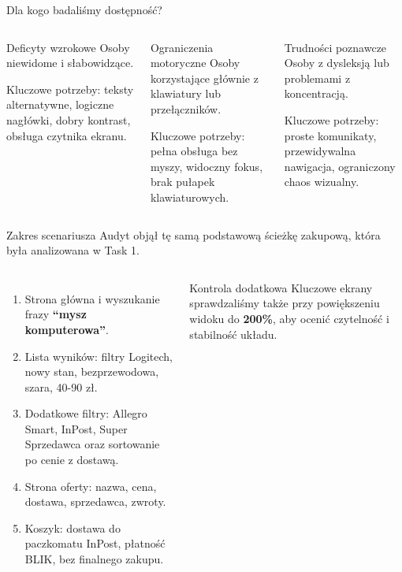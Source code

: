 \documentclass[aspectratio=169,11pt]{beamer}
\newcommand{\tagline}[1]{\textcolor{Slate}{\small #1}}
\begin{document}
\begin{frame}{Dla kogo badaliśmy dostępność?}
  \begin{columns}[T,totalwidth=\textwidth]
      \begin{block}{Deficyty wzrokowe}
        Osoby niewidome i słabowidzące.

        \vspace{0.25cm}
        Kluczowe potrzeby: teksty alternatywne, logiczne nagłówki, dobry kontrast, obsługa czytnika ekranu.
      \end{block}

      \begin{block}{Ograniczenia motoryczne}
        Osoby korzystające głównie z klawiatury lub przełączników.

        \vspace{0.25cm}
        Kluczowe potrzeby: pełna obsługa bez myszy, widoczny fokus, brak pułapek klawiaturowych.
      \end{block}

      \begin{block}{Trudności poznawcze}
        Osoby z dysleksją lub problemami z koncentracją.

        \vspace{0.25cm}
        Kluczowe potrzeby: proste komunikaty, przewidywalna nawigacja, ograniczony chaos wizualny.
      \end{block}
  \end{columns}
\end{frame}

\begin{frame}{Zakres scenariusza}
  \tagline{Audyt objął tę samą podstawową ścieżkę zakupową, która była analizowana w Task 1.}

  \vspace{0.25cm}
  \begin{columns}[T,totalwidth=\textwidth]
      \begin{enumerate}
        \item Strona główna i wyszukanie frazy \textbf{``mysz komputerowa''}.
        \item Lista wyników: filtry Logitech, nowy stan, bezprzewodowa, szara, 40-90 zł.
        \item Dodatkowe filtry: Allegro Smart, InPost, Super Sprzedawca oraz sortowanie po cenie z dostawą.
        \item Strona oferty: nazwa, cena, dostawa, sprzedawca, zwroty.
        \item Koszyk: dostawa do paczkomatu InPost, płatność BLIK, bez finalnego zakupu.
      \end{enumerate}

      \begin{alertblock}{Kontrola dodatkowa}
        Kluczowe ekrany sprawdzaliśmy także przy powiększeniu widoku do \textbf{200\%}, aby ocenić czytelność i stabilność układu.
      \end{alertblock}
  \end{columns}
\end{frame}
\end{document}
